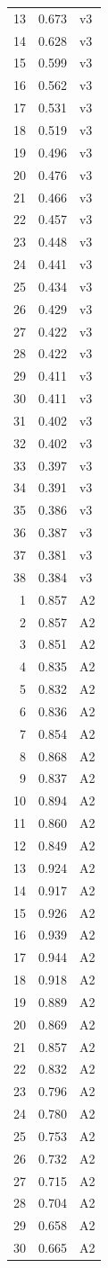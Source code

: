\begin{tabular}{rrl}
13 & 0.673 & v3 \\
14 & 0.628 & v3 \\
15 & 0.599 & v3 \\
16 & 0.562 & v3 \\
17 & 0.531 & v3 \\
18 & 0.519 & v3 \\
19 & 0.496 & v3 \\
20 & 0.476 & v3 \\
21 & 0.466 & v3 \\
22 & 0.457 & v3 \\
23 & 0.448 & v3 \\
24 & 0.441 & v3 \\
25 & 0.434 & v3 \\
26 & 0.429 & v3 \\
27 & 0.422 & v3 \\
28 & 0.422 & v3 \\
29 & 0.411 & v3 \\
30 & 0.411 & v3 \\
31 & 0.402 & v3 \\
32 & 0.402 & v3 \\
33 & 0.397 & v3 \\
34 & 0.391 & v3 \\
35 & 0.386 & v3 \\
36 & 0.387 & v3 \\
37 & 0.381 & v3 \\
38 & 0.384 & v3 \\
1 & 0.857 & A2 \\
2 & 0.857 & A2 \\
3 & 0.851 & A2 \\
4 & 0.835 & A2 \\
5 & 0.832 & A2 \\
6 & 0.836 & A2 \\
7 & 0.854 & A2 \\
8 & 0.868 & A2 \\
9 & 0.837 & A2 \\
10 & 0.894 & A2 \\
11 & 0.860 & A2 \\
12 & 0.849 & A2 \\
13 & 0.924 & A2 \\
14 & 0.917 & A2 \\
15 & 0.926 & A2 \\
16 & 0.939 & A2 \\
17 & 0.944 & A2 \\
18 & 0.918 & A2 \\
19 & 0.889 & A2 \\
20 & 0.869 & A2 \\
21 & 0.857 & A2 \\
22 & 0.832 & A2 \\
23 & 0.796 & A2 \\
24 & 0.780 & A2 \\
25 & 0.753 & A2 \\
26 & 0.732 & A2 \\
27 & 0.715 & A2 \\
28 & 0.704 & A2 \\
29 & 0.658 & A2 \\
30 & 0.665 & A2 \\
\bottomrule
\end{tabular}
